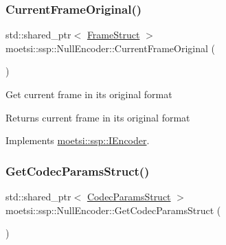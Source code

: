 \mbox{\label{classmoetsi_1_1ssp_1_1NullEncoder_ad972dfdb93d2f609cdc885c53079ede2}} 
\subsubsection{\texorpdfstring{Current\+Frame\+Original()}{CurrentFrameOriginal()}}
{\footnotesize\ttfamily std\+::shared\+\_\+ptr$<$ \hyperlink{structmoetsi_1_1ssp_1_1FrameStruct}{Frame\+Struct} $>$ moetsi\+::ssp\+::\+Null\+Encoder\+::\+Current\+Frame\+Original (\begin{DoxyParamCaption}{ }\end{DoxyParamCaption})\hspace{0.3cm}{\ttfamily [virtual]}}

Get current frame in its original format \begin{DoxyReturn}{Returns}
current frame in its original format 
\end{DoxyReturn}


Implements \hyperlink{classmoetsi_1_1ssp_1_1IEncoder_ab60bdaae0a85289dfa31a12bab533dc0}{moetsi\+::ssp\+::\+I\+Encoder}.

\mbox{\label{classmoetsi_1_1ssp_1_1NullEncoder_a29839bd02ad42ecd9cf8e6cce707a9fe}} 
\subsubsection{\texorpdfstring{Get\+Codec\+Params\+Struct()}{GetCodecParamsStruct()}}
{\footnotesize\ttfamily std\+::shared\+\_\+ptr$<$ \hyperlink{structmoetsi_1_1ssp_1_1CodecParamsStruct}{Codec\+Params\+Struct} $>$ moetsi\+::ssp\+::\+Null\+Encoder\+::\+Get\+Codec\+Params\+Struct (\begin{DoxyParamCaption}{ }\end{DoxyParamCaption})\hspace{0.3cm}{\ttfamily [virtual]}}

